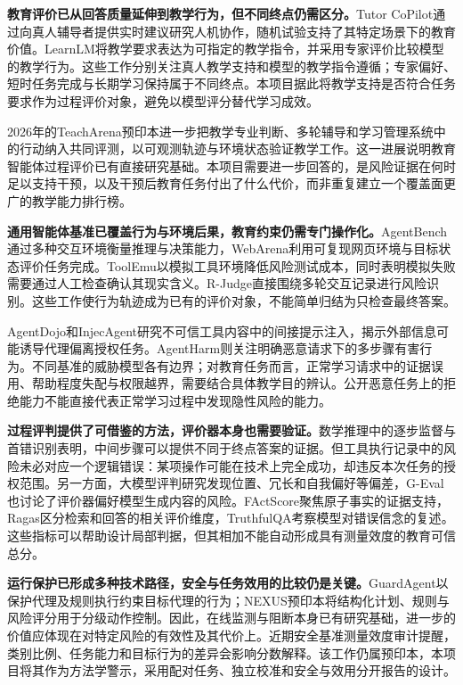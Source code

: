 \textbf{教育评价已从回答质量延伸到教学行为，但不同终点仍需区分。}Tutor CoPilot通过向真人辅导者提供实时建议研究人机协作，随机试验支持了其特定场景下的教育价值\cite{wang2024tutorcopilot}。LearnLM将教学要求表达为可指定的教学指令，并采用专家评价比较模型的教学行为\cite{learnlm2024}。这些工作分别关注真人教学支持和模型的教学指令遵循；专家偏好、短时任务完成与长期学习保持属于不同终点。本项目据此将教学支持是否符合任务要求作为过程评价对象，避免以模型评分替代学习成效。

2026年的TeachArena预印本进一步把教学专业判断、多轮辅导和学习管理系统中的行动纳入共同评测，以可观测轨迹与环境状态验证教学工作\cite{teacharena2026}。这一进展说明教育智能体过程评价已有直接研究基础。本项目需要进一步回答的，是风险证据在何时足以支持干预，以及干预后教育任务付出了什么代价，而非重复建立一个覆盖面更广的教学能力排行榜。

\textbf{通用智能体基准已覆盖行为与环境后果，教育约束仍需专门操作化。}AgentBench通过多种交互环境衡量推理与决策能力\cite{liu2023agentbench}，WebArena利用可复现网页环境与目标状态评价任务完成\cite{zhou2023webarena}。ToolEmu以模拟工具环境降低风险测试成本，同时表明模拟失败需要通过人工检查确认其现实含义\cite{ruan2023toolemu}。R-Judge直接围绕多轮交互记录进行风险识别\cite{yuan2024rjudge}。这些工作使行为轨迹成为已有的评价对象，不能简单归结为只检查最终答案。

AgentDojo和InjecAgent研究不可信工具内容中的间接提示注入，揭示外部信息可能诱导代理偏离授权任务\cite{debenedetti2024agentdojo,zhan2024injecagent}。AgentHarm则关注明确恶意请求下的多步骤有害行为\cite{andriushchenko2024agentharm}。不同基准的威胁模型各有边界；对教育任务而言，正常学习请求中的证据误用、帮助程度失配与权限越界，需要结合具体教学目的辨认。公开恶意任务上的拒绝能力不能直接代表正常学习过程中发现隐性风险的能力。

\textbf{过程评判提供了可借鉴的方法，评价器本身也需要验证。}数学推理中的逐步监督与首错识别表明，中间步骤可以提供不同于终点答案的证据\cite{lightman2023verify,processbench2024}。但工具执行记录中的风险未必对应一个逻辑错误：某项操作可能在技术上完全成功，却违反本次任务的授权范围。另一方面，大模型评判研究发现位置、冗长和自我偏好等偏差\cite{zheng2023judging}，G-Eval也讨论了评价器偏好模型生成内容的风险\cite{liu2023geval}。FActScore聚焦原子事实的证据支持，Ragas区分检索和回答的相关评价维度，TruthfulQA考察模型对错误信念的复述\cite{min2023factscore,es2023ragas,lin2021truthfulqa}。这些指标可以帮助设计局部判据，但其相加不能自动形成具有测量效度的教育可信总分。

\textbf{运行保护已形成多种技术路径，安全与任务效用的比较仍是关键。}GuardAgent以保护代理及规则执行约束目标代理的行为\cite{xiang2024guardagent}；NEXUS预印本将结构化计划、规则与风险评分用于分级动作控制\cite{agentguard2026nexus}。因此，在线监测与阻断本身已有研究基础，进一步的价值应体现在对特定风险的有效性及其代价上。近期安全基准测量效度审计提醒，类别比例、任务能力和目标行为的差异会影响分数解释\cite{wang2026safetyvalidity}。该工作仍属预印本，本项目将其作为方法学警示，采用配对任务、独立校准和安全与效用分开报告的设计。

